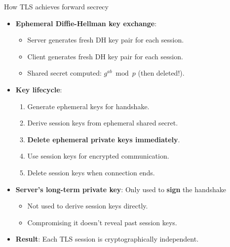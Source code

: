 \documentclass[aspectratio=169, lualatex, handout]{beamer}
\begin{document}
\begin{frame}{How TLS achieves forward secrecy}
	\begin{itemize}
		\item \textbf{Ephemeral Diffie-Hellman key exchange}:
		      \begin{itemize}
			      \item Server generates fresh DH key pair for each session.
			      \item Client generates fresh DH key pair for each session.
			      \item Shared secret computed: $g^{ab} \bmod p$ (then deleted!).
		      \end{itemize}
		\item \textbf{Key lifecycle}:
		      \begin{enumerate}
			      \item Generate ephemeral keys for handshake.
			      \item Derive session keys from ephemeral shared secret.
			      \item \textbf{Delete ephemeral private keys immediately}.
			      \item Use session keys for encrypted communication.
			      \item Delete session keys when connection ends.
		      \end{enumerate}
		\item \textbf{Server's long-term private key}: Only used to \textbf{sign} the handshake
		      \begin{itemize}
			      \item Not used to derive session keys directly.
			      \item Compromising it doesn't reveal past session keys.
		      \end{itemize}
		\item \textbf{Result}: Each TLS session is cryptographically independent.
	\end{itemize}
\end{frame}
\end{document}
